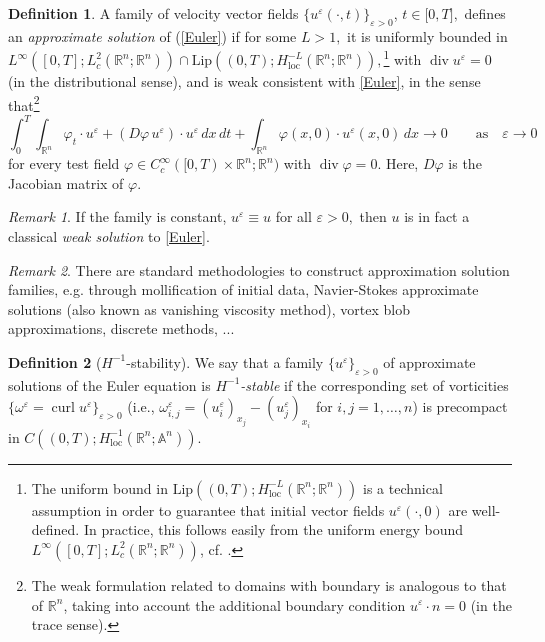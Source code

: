 \documentclass[11pt, a4paper,leqno]{amsart}
\theoremstyle{plain}
\numberwithin{equation}{section}
\theoremstyle{definition}
\newtheorem{definition}{Definition}
\theoremstyle{remark}
\newtheorem{remark}{Remark}
\begin{document}
\begin{definition}
\label{def:approxsol}A family of velocity vector
fields $\{u^{\varepsilon}(\cdot,t)\}_{\varepsilon>0}$, $t\in\lbrack0,T],$ defines
an \emph{approximate solution} of (\ref{Euler}) if for some $L>1,$ it is
uniformly bounded in
$L^{\infty}([0,T];L_{c}^{2}(\mathbb{R}^{n};\mathbb{R}^{n}))\cap\text{Lip}%
((0,T);H_{\text{loc}}^{-L}(\mathbb{R}^{n};\mathbb{R}^{n})),$\footnote{The
uniform bound in $\text{Lip}((0,T); H_{\text{loc}}^{-L}(\mathbb{R}%
^{n};\mathbb{R}^{n}))$ is a technical assumption in order to guarantee that
initial vector fields $u^{\varepsilon}(\cdot,0)$ are well-defined. In
practice, this follows easily from the uniform energy bound $L^{\infty
}([0,T];L_{c}^{2}(\mathbb{R}^{n};\mathbb{R}^{n}))$, cf. \cite{DiPernaMajda}.}
with $\operatorname{div}u^{\varepsilon}=0$ (in the distributional sense), and
is weak consistent with \eqref{Euler}, in the sense that\footnote{The weak
formulation related to domains with boundary is analogous to that of
$\mathbb{R}^{n}$, taking into account the additional boundary condition
$u^{\varepsilon}\cdot n=0$ (in the trace sense).}
\begin{equation*}
\int_{0}^{T}\int_{\mathbb{R}^{n}}\varphi_{t}\cdot u^{\varepsilon}%
+(D\varphi\,u^{\varepsilon})\cdot u^{\varepsilon}\,dx\,dt+\int_{\mathbb{R}%
^{n}}\varphi(x,0)\cdot u^{\varepsilon}(x,0)\,dx\rightarrow0\qquad
\text{as}\quad\varepsilon\rightarrow0 
\end{equation*}
for every test field $\varphi\in C_{c}^{\infty}([0,T)\times\mathbb{R}%
^{n};\mathbb{R}^{n})$ with $\operatorname{div}\varphi=0$. Here, $D\varphi$ is
the Jacobian matrix of $\varphi$.
\end{definition}

\begin{remark}
If the family is constant, $u^{\varepsilon}\equiv u$ for all
$\varepsilon>0,$ then $u$ is in fact a classical \emph{weak solution} to \eqref{Euler}.
\end{remark}

\begin{remark}
There are standard methodologies to construct approximation solution families,
e.g. through mollification of initial data, Navier-Stokes approximate
solutions (also known as vanishing viscosity method), vortex blob approximations, discrete methods, ...
\end{remark}

\begin{definition}[$H^{-1}$-stability]\label{def:h-1} We
say that a family $\{u^{\varepsilon}\}_{\varepsilon>0}$ of approximate
solutions of the Euler equation is \emph{$H^{-1}$-stable} if the corresponding
set of vorticities $\{\omega^{\varepsilon}= \operatorname{curl}u^{\varepsilon
}\}_{\varepsilon > 0}$ (i.e., $\omega_{i,j}^{\varepsilon}=(u_{i}^{\varepsilon})_{x_{j}}%
-(u_{j}^{\varepsilon})_{x_{i}}$ for $i,j=1,\ldots,n$) is precompact
in $C((0,T);H_{\text{loc}}^{-1}(\mathbb{R}%
^{n};\mathbb{A}^{n})).$
\end{definition}
\end{document}
